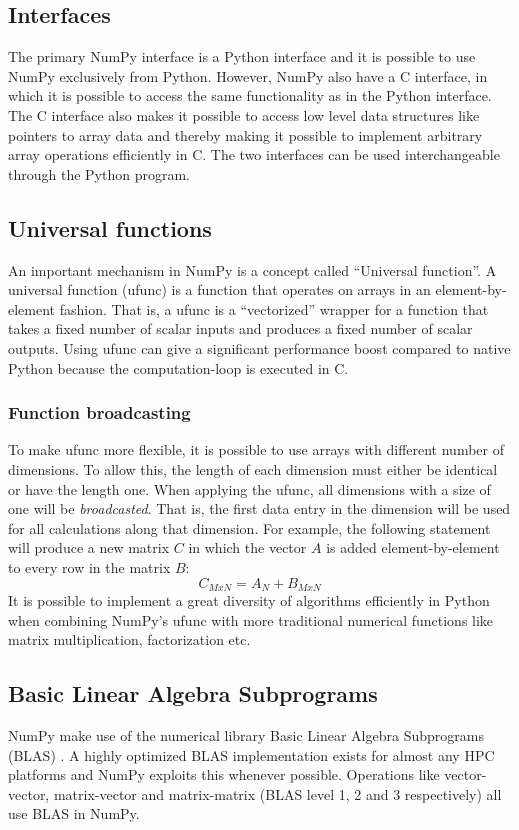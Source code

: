 \documentclass[10pt]{article}
\begin{document}
\subsection{Interfaces}
The primary NumPy interface is a Python interface and it is possible to use NumPy exclusively from Python. However, NumPy also have a C interface, in which it is possible to access the same functionality as in the Python interface. The C interface also makes it possible to access low level data structures like pointers to array data and thereby making it possible to implement arbitrary array operations efficiently in C. The two interfaces can be used interchangeable through the Python program.

\subsection{Universal functions}
An important mechanism in NumPy is a concept called “Universal function”. A universal function (ufunc) is a function that operates on arrays in an element-by-element fashion. That is, a ufunc is a “vectorized” wrapper for a function that takes a fixed number of scalar inputs and produces a fixed number of scalar outputs. Using ufunc can give a significant performance boost compared to native Python because the computation-loop is executed in C.

\subsubsection{Function broadcasting}
To make ufunc more flexible, it is possible to use arrays with different number of dimensions. To allow this, the length of each dimension must either be identical or have the length one. When applying the ufunc, all dimensions with a size of one will be \emph{broadcasted}. That is, the first data entry in the dimension will be used for all calculations along that dimension. For example, the following statement will produce a new matrix $C$ in which the vector $A$ is added element-by-element to every row in the matrix $B$: \[C_{MxN} = A_N+B_{MxN}\]
It is possible to implement a great diversity of algorithms efficiently in Python when combining NumPy's ufunc with more traditional numerical functions like matrix multiplication, factorization etc.


\subsection{Basic Linear Algebra Subprograms}
NumPy make use of the numerical library Basic Linear Algebra Subprograms (BLAS) \cite{blas79}. A highly optimized BLAS implementation exists for almost any HPC platforms and NumPy exploits this whenever possible. Operations like vector-vector, matrix-vector and matrix-matrix (BLAS level 1, 2 and 3 respectively) all use BLAS in NumPy. 
\end{document}

